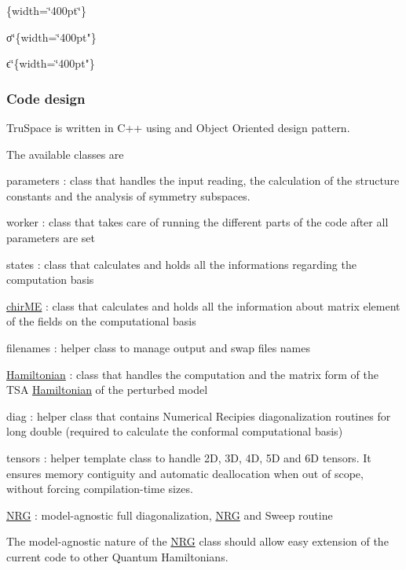 \{width=\char`\"{}400pt\char`\"{}\}

 σ\char`\"{}\{width=\char`\"{}400pt"\}

 ϵ\char`\"{}\{width=\char`\"{}400pt"\}

\subsubsection*{Code design}

Tru\+Space is written in C++ using and Object Oriented design pattern.

The available classes are


\begin{DoxyItemize}
\item parameters \+: class that handles the input reading, the calculation of the structure constants and the analysis of symmetry subspaces.
\item worker \+: class that takes care of running the different parts of the code after all parameters are set
\item states \+: class that calculates and holds all the informations regarding the computation basis
\item \mbox{\hyperlink{classchirME}{chir\+ME}} \+: class that calculates and holds all the information about matrix element of the fields on the computational basis
\item filenames \+: helper class to manage output and swap files names
\item \mbox{\hyperlink{classHamiltonian}{Hamiltonian}} \+: class that handles the computation and the matrix form of the T\+SA \mbox{\hyperlink{classHamiltonian}{Hamiltonian}} of the perturbed model
\item diag \+: helper class that contains Numerical Recipies diagonalization routines for long double (required to calculate the conformal computational basis)
\item tensors \+: helper template class to handle 2D, 3D, 4D, 5D and 6D tensors. It ensures memory contiguity and automatic deallocation when out of scope, without forcing compilation-\/time sizes.
\item \mbox{\hyperlink{classNRG}{N\+RG}} \+: model-\/agnostic full diagonalization, {\ttfamily \mbox{\hyperlink{classNRG}{N\+RG}}} and {\ttfamily Sweep} routine
\end{DoxyItemize}

The model-\/agnostic nature of the \mbox{\hyperlink{classNRG}{N\+RG}} class should allow easy extension of the current code to other Quantum Hamiltonians.

